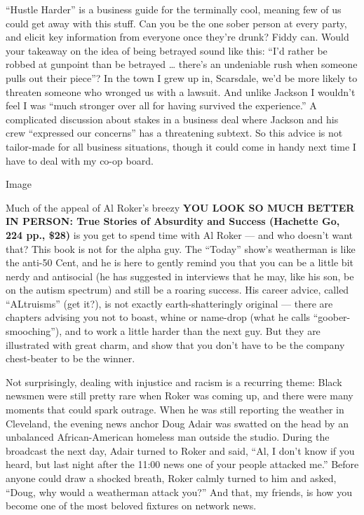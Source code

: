 ``Hustle Harder'' is a business guide for the terminally cool, meaning
few of us could get away with this stuff. Can you be the one sober
person at every party, and elicit key information from everyone once
they're drunk? Fiddy can. Would your takeaway on the idea of being
betrayed sound like this: ``I'd rather be robbed at gunpoint than be
betrayed \ldots{} there's an undeniable rush when someone pulls out
their piece''? In the town I grew up in, Scarsdale, we'd be more likely
to threaten someone who wronged us with a lawsuit. And unlike Jackson I
wouldn't feel I was ``much stronger over all for having survived the
experience.'' A complicated discussion about stakes in a business deal
where Jackson and his crew ``expressed our concerns'' has a threatening
subtext. So this advice is not tailor-made for all business situations,
though it could come in handy next time I have to deal with my co-op
board.

Image

Much of the appeal of Al Roker's breezy \textbf{YOU LOOK SO MUCH BETTER
IN PERSON: True Stories of Absurdity and Success (Hachette Go, 224 pp.,
\$28)} is you get to spend time with Al Roker --- and who doesn't want
that? This book is not for the alpha guy. The ``Today'' show's
weatherman is like the anti-50 Cent, and he is here to gently remind you
that you can be a little bit nerdy and antisocial (he has suggested in
interviews that he may, like his son, be on the autism spectrum) and
still be a roaring success. His career advice, called ``ALtruisms'' (get
it?), is not exactly earth-shatteringly original --- there are chapters
advising you not to boast, whine or name-drop (what he calls
``goober-smooching''), and to work a little harder than the next guy.
But they are illustrated with great charm, and show that you don't have
to be the company chest-beater to be the winner.

Not surprisingly, dealing with injustice and racism is a recurring
theme: Black newsmen were still pretty rare when Roker was coming up,
and there were many moments that could spark outrage. When he was still
reporting the weather in Cleveland, the evening news anchor Doug Adair
was swatted on the head by an unbalanced African-American homeless man
outside the studio. During the broadcast the next day, Adair turned to
Roker and said, ``Al, I don't know if you heard, but last night after
the 11:00 news one of your people attacked me.'' Before anyone could
draw a shocked breath, Roker calmly turned to him and asked, ``Doug, why
would a weatherman attack you?'' And that, my friends, is how you become
one of the most beloved fixtures on network news.

